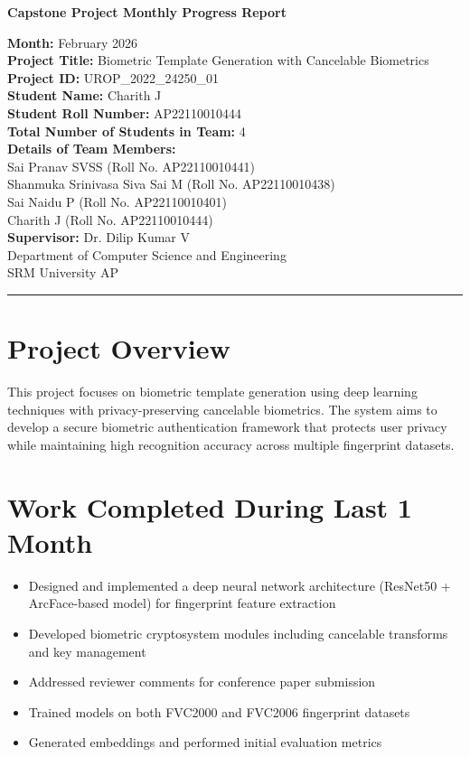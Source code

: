 \documentclass[12pt,a4paper]{article}
\begin{document}
\begin{center}
    \Large \textbf{Capstone Project Monthly Progress Report}\\[0.5cm]
    \normalsize
    
    \textbf{Month:} February 2026 \\[0.5cm]
    \textbf{Project Title:} Biometric Template Generation with Cancelable Biometrics \\[0.5cm]
    \textbf{Project ID:} UROP\_2022\_24250\_01\\[0.5cm]
    \textbf{Student Name:} Charith J \\
    \textbf{Student Roll Number:} AP22110010444\\

    \textbf{Total Number of Students in Team:} 4 \\[0.3cm]
    \textbf{Details of Team Members:}\\
    Sai Pranav SVSS  (Roll No. AP22110010441)\\
    Shanmuka Srinivasa Siva Sai M (Roll No. AP22110010438)\\
    Sai Naidu P (Roll No. AP22110010401)\\
    Charith J (Roll No. AP22110010444)\\[0.2cm]
    \textbf{Supervisor:} Dr. Dilip Kumar V \\[0.5cm]
    Department of Computer Science and Engineering\\
    SRM University AP
\end{center}

\hrule
\vspace{1cm}

\section{Project Overview}
This project focuses on biometric template generation using deep learning techniques with privacy-preserving cancelable biometrics. The system aims to develop a secure biometric authentication framework that protects user privacy while maintaining high recognition accuracy across multiple fingerprint datasets.

\section{Work Completed During Last 1 Month}
\begin{itemize}[leftmargin=*]
    \item Designed and implemented a deep neural network architecture (ResNet50 + ArcFace-based model) for fingerprint feature extraction
    \item Developed biometric cryptosystem modules including cancelable transforms and key management
    \item Addressed reviewer comments for conference paper submission
    \item Trained models on both FVC2000 and FVC2006 fingerprint datasets
    \item Generated embeddings and performed initial evaluation metrics
\end{itemize}
\end{document}
